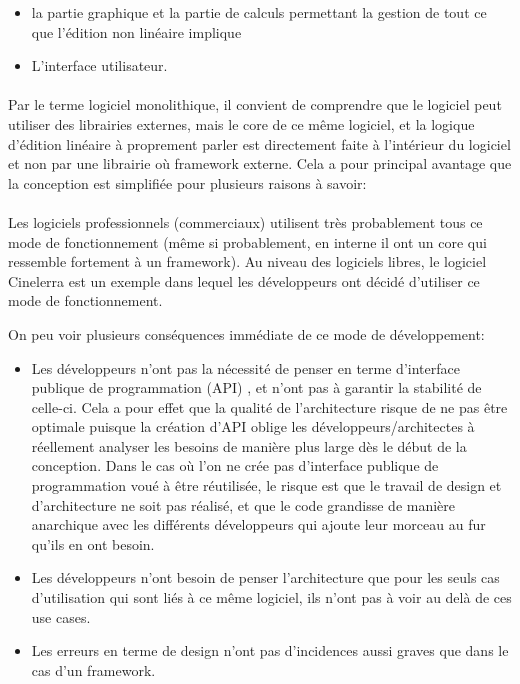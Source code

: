 \begin{itemize} \setlength{\itemsep}{2mm}
  \item { la partie graphique et la partie de calculs
    permettant la gestion de tout ce que l'édition non linéaire implique}
  \item {L'interface utilisateur.}
\end {itemize}

\paragraph{}
Par le terme logiciel monolithique, il convient de
comprendre que le logiciel peut utiliser des librairies externes, mais
le core de ce même logiciel, et la logique d'édition linéaire à
proprement parler est directement faite à l'intérieur du logiciel et
non par une librairie où framework externe. Cela a pour principal avantage
que la conception est simplifiée pour plusieurs raisons à savoir:

\paragraph{}
Les logiciels professionnels (commerciaux) utilisent très probablement
tous ce mode de fonctionnement (même si probablement, en interne il ont
un core qui ressemble fortement à un framework). Au niveau des logiciels libres,
le logiciel Cinelerra est un exemple dans lequel les développeurs
ont décidé d'utiliser ce mode de fonctionnement.

On peu voir plusieurs conséquences immédiate de ce mode de développement:
\begin{itemize} \setlength{\itemsep}{2mm}
  \item {Les développeurs n'ont pas la nécessité de penser
    en terme d'interface publique de programmation (API) ,
    et n'ont pas à garantir la stabilité de celle-ci. Cela
    a pour effet que la qualité de l'architecture
    risque de ne pas être optimale puisque la création d'API  oblige
    les développeurs/architectes à réellement analyser les besoins
    de manière plus large dès le début de la conception. Dans le cas
    où l'on ne crée pas d'interface publique de programmation voué à
    être réutilisée, le risque est que le travail de design et
    d'architecture ne soit pas réalisé, et que le code grandisse de manière
    anarchique avec les différents développeurs qui ajoute leur morceau au fur
    qu'ils en ont besoin.}
  \item {Les développeurs n'ont besoin de penser l'architecture que pour
    les seuls cas d'utilisation qui sont liés à ce même logiciel, %
    ils n'ont pas à voir au delà de ces use cases.}
  \item {Les erreurs en terme de design n'ont pas d'incidences aussi graves
    que dans le cas d'un framework.}
\end {itemize}

